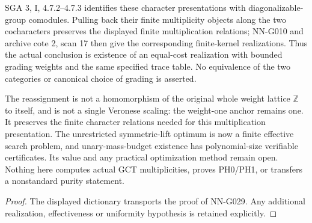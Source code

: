 \begin{geometricstatement}[NN-G029]
SGA 3, I, 4.7.2--4.7.3 identifies these character
presentations with diagonalizable-group comodules.
Pulling back their finite multiplicity objects along
the two cocharacters preserves the displayed finite
multiplication relations; NN-G010 and archive cote 2,
scan 17 then give the corresponding finite-kernel
realizations. Thus the actual conclusion is existence
of an equal-cost realization with bounded grading
weights and the same specified trace table. No equivalence
of the two categories or canonical choice of grading
is asserted.

The reassignment is not a homomorphism of the original
whole weight lattice $\mathbb Z$ to itself, and is not
a single Veronese scaling: the weight-one anchor remains
one. It preserves the finite character relations needed
for this multiplication presentation. The unrestricted
symmetric-lift optimum is now a finite effective search
problem, and unary-mass-budget existence has polynomial-size
verifiable certificates. Its value and any practical
optimization method remain open. Nothing here computes actual GCT multiplicities,
proves PH0/PH1, or transfers a nonstandard purity statement.


\end{geometricstatement}
\begin{proof} The displayed dictionary transports the proof of NN-G029. Any additional realization, effectiveness or uniformity hypothesis is retained explicitly.\end{proof}


